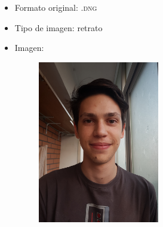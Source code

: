 \documentclass[11pt,a4paper]{article}
\begin{document}
\begin{itemize}
	\item Formato original: \textsc{.dng}
	\item Tipo de imagen: retrato
	\item Imagen:
		\begin{figure}[H]
		\centering
			\includegraphics[width=0.5\textwidth]{Fotos/retrato.jpg}
		\end{figure}	
\end{itemize}
\end{document}
